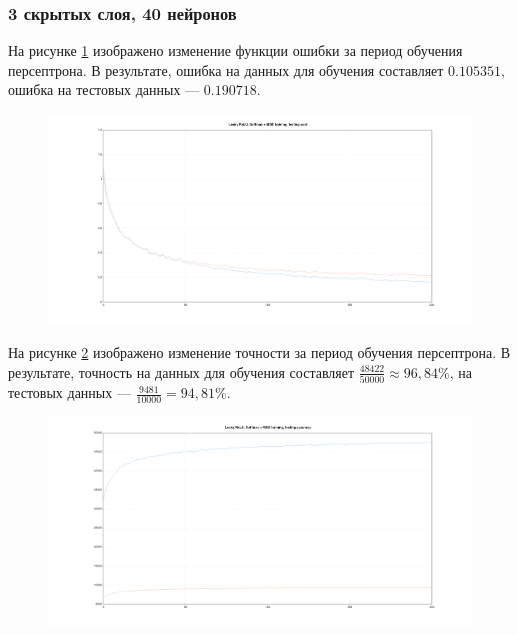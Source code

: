 \documentclass[a4paper, 14pt]{extarticle}
\begin{document}
\subsubsection{3 скрытых слоя, 40 нейронов}


На рисунке \ref{fig:3_40_leaky_relu_softmax_mse_cost} изображено изменение функции ошибки за период обучения персептрона.
В результате, ошибка на данных для обучения составляет $0.105351$, ошибка на тестовых данных --- $0.190718$.

\begin{figure}[!htb]
  \centering\includegraphics[width=\textwidth]{images/3_40_leaky_relu_softmax_mse_cost.png}
  \caption{}
  \label{fig:3_40_leaky_relu_softmax_mse_cost}
\end{figure}

На рисунке \ref{fig:3_40_leaky_relu_softmax_mse_accuracy} изображено изменение точности за период обучения персептрона.
В результате, точность на данных для обучения составляет $\frac{48422}{50000} \approx 96,84\%$, на тестовых данных --- $\frac{9481}{10000} = 94,81\%$.

\begin{figure}[!htb]
  \centering\includegraphics[width=\textwidth]{images/3_40_leaky_relu_softmax_mse_accuracy.png}
  \caption{}
  \label{fig:3_40_leaky_relu_softmax_mse_accuracy}
\end{figure}
\end{document}
